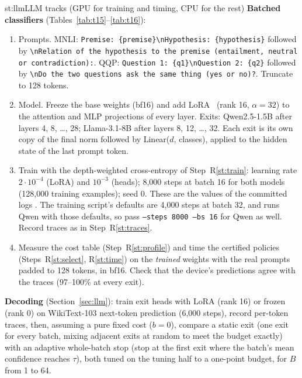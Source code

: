 \begin{step}{st:llm}{LLM tracks (GPU for training and timing, CPU for the rest)}
\textbf{Batched classifiers} (Tables~\ref{tab:t15}--\ref{tab:t16}):
\begin{enumerate}
  \item Prompts. MNLI: \texttt{Premise: \{premise\}\textbackslash nHypothesis: \{hypothesis\}} followed by
  \texttt{\textbackslash nRelation of the hypothesis to the premise (entailment, neutral or contradiction):}. QQP:
  \texttt{Question 1: \{q1\}\textbackslash nQuestion 2: \{q2\}} followed by
  \texttt{\textbackslash nDo the two questions ask the same thing (yes or no)?}. Truncate to 128 tokens.
  \item Model. Freeze the base weights (bf16) and add LoRA~\cite{lora} (rank 16, $\alpha=32$) to the attention and MLP projections
  of every layer. Exits: Qwen2.5-1.5B after layers 4, 8, \dots, 28; Llama-3.1-8B after layers 8, 12, \dots, 32. Each
  exit is its own copy of the final norm followed by Linear($d$, classes), applied to the hidden state of the last
  prompt token.
  \item Train with the depth-weighted cross-entropy of Step~R\ref{st:train}: learning rate $2\cdot10^{-4}$ (LoRA)
  and $10^{-3}$ (heads); 8{,}000 steps at batch 16 for both models (128{,}000 training examples); seed 0. These are the values of the
  committed logs . The training script's defaults are 4{,}000
  steps at batch 32, and  runs Qwen with those defaults, so pass
  \texttt{--steps 8000 --bs 16} for Qwen as well. Record traces as in
  Step~R\ref{st:traces}.
  \item Measure the cost table (Step~R\ref{st:profile}) and time the certified policies (Steps~R\ref{st:select},
  R\ref{st:time}) on the \emph{trained} weights with the real prompts padded to 128 tokens, in bf16. Check that the
  device's predictions agree with the traces (97--100\% at every exit).
\end{enumerate}
\textbf{Decoding} (Section~\ref{sec:llm}): train exit heads with LoRA (rank 16) or frozen (rank 0) on WikiText-103
next-token prediction (6{,}000 steps), record per-token traces, then, assuming a pure fixed cost ($b=0$), compare a
static exit (one exit for every batch, mixing adjacent exits at random to meet the budget exactly) with an adaptive
whole-batch stop (stop at the first exit where the batch's mean confidence reaches $\tau$), both tuned on the tuning
half to a one-point budget, for $B$ from 1 to 64.
\end{step}

